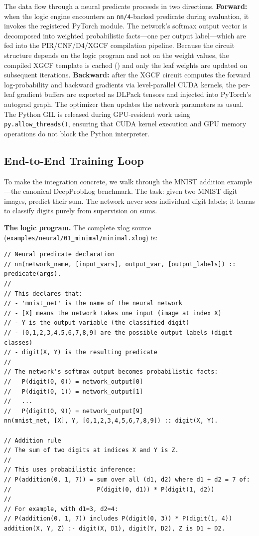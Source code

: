 The data flow through a neural predicate proceeds in two directions. \textbf{Forward:} when the logic engine encounters an \texttt{nn/4}-backed predicate during evaluation, it invokes the registered PyTorch module. The network's softmax output vector is decomposed into weighted probabilistic facts---one per output label---which are fed into the PIR/CNF/D4/XGCF compilation pipeline. Because the circuit structure depends on the logic program and not on the weight values, the compiled XGCF template is cached () and only the leaf weights are updated on subsequent iterations. \textbf{Backward:} after the XGCF circuit computes the forward log-probability and backward gradients via level-parallel CUDA kernels, the per-leaf gradient buffers are exported as DLPack tensors and injected into PyTorch's autograd graph. The optimizer then updates the network parameters as usual. The Python GIL is released during GPU-resident work using \texttt{py.allow\_threads()}, ensuring that CUDA kernel execution and GPU memory operations do not block the Python interpreter.

\subsection{End-to-End Training Loop}

To make the integration concrete, we walk through the MNIST addition example---the canonical DeepProbLog benchmark. The task: given two MNIST digit images, predict their sum. The network never sees individual digit labels; it learns to classify digits purely from supervision on sums.

\textbf{The logic program.} The complete xlog source (\texttt{examples/neural/01\_minimal/minimal.xlog}) is:

\begin{lstlisting}[style=xlogstyle]
// Neural predicate declaration
// nn(network_name, [input_vars], output_var, [output_labels]) :: predicate(args).
//
// This declares that:
// - 'mnist_net' is the name of the neural network
// - [X] means the network takes one input (image at index X)
// - Y is the output variable (the classified digit)
// - [0,1,2,3,4,5,6,7,8,9] are the possible output labels (digit classes)
// - digit(X, Y) is the resulting predicate
//
// The network's softmax output becomes probabilistic facts:
//   P(digit(0, 0)) = network_output[0]
//   P(digit(0, 1)) = network_output[1]
//   ...
//   P(digit(0, 9)) = network_output[9]
nn(mnist_net, [X], Y, [0,1,2,3,4,5,6,7,8,9]) :: digit(X, Y).

// Addition rule
// The sum of two digits at indices X and Y is Z.
//
// This uses probabilistic inference:
// P(addition(0, 1, 7)) = sum over all (d1, d2) where d1 + d2 = 7 of:
//                        P(digit(0, d1)) * P(digit(1, d2))
//
// For example, with d1=3, d2=4:
// P(addition(0, 1, 7)) includes P(digit(0, 3)) * P(digit(1, 4))
addition(X, Y, Z) :- digit(X, D1), digit(Y, D2), Z is D1 + D2.
\end{lstlisting}


